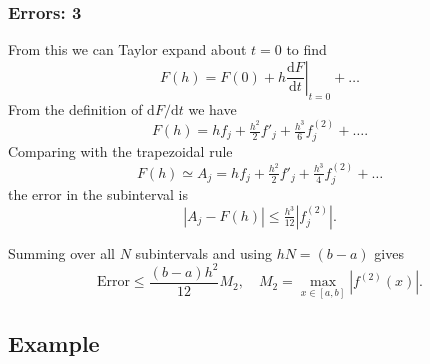 \documentclass{beamer}
\begin{document}
\begin{frame}
  \frametitle{Errors: 3}

  From this we can Taylor expand about $t=0$ to find
  \begin{equation*}
    F(h) = F(0) + h \left. \frac{\text{d}F}{\text{d}t} \right|_{t=0}
    + \dots
  \end{equation*} \pause
  From the definition of $\text{d}F / \text{d}t$ we have
  \begin{equation*}
    F(h) = h f_j + \tfrac{h^2}{2} f'_j + \tfrac{h^3}{6} f^{(2)}_j + \dots.
  \end{equation*} \pause
  Comparing with the trapezoidal rule
  \begin{equation*}
    F(h) \simeq A_j = h f_j + \tfrac{h^2}{2} f'_j + \tfrac{h^3}{4}
    f^{(2)}_j + \dots
  \end{equation*}
  the error in the subinterval is
  \begin{equation*}
    | A_j - F(h) | \leq \tfrac{h^3}{12} |f^{(2)}_j| .
  \end{equation*} \pause

  Summing over all $N$ subintervals and using $h N = (b - a)$ gives
  \begin{equation*}
    \text{Error} \leq \frac{(b - a) h^2}{12} M_2, \quad M_2 =
    \max_{x\in[a,b]} | f^{(2)}(x) |.
  \end{equation*}

\end{frame}

\subsection{Example}
\end{document}
